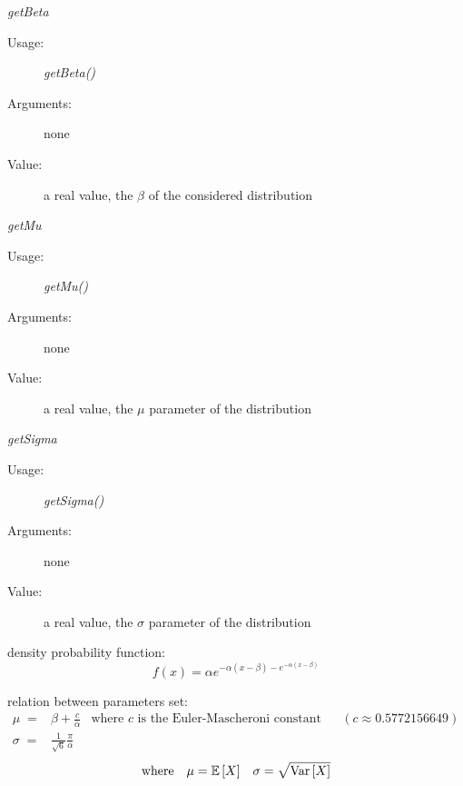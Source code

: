 \begin{description}
\begin{description}
\item \textit{getBeta}
\begin{description}
\item[Usage:] \textit{getBeta()}
\item[Arguments:] none
\item[Value:]  a real value, the  $\beta$ of the considered distribution
\end{description}
\bigskip
\item \textit{getMu}
\begin{description}
\item[Usage:] \textit{getMu()}
\item[Arguments:] none
\item[Value:]  a real value,  the $\mu$ parameter of the  distribution
\end{description}
\bigskip
\item \textit{getSigma}
\begin{description}
\item[Usage:] \textit{getSigma()}
\item[Arguments:] none
\item[Value:]  a real value,  the $\sigma$ parameter of the  distribution
\end{description}
\bigskip
\end{description}

\item[Details:]  \rule{0pt}{1em}
\begin{description}
\item density probability function:
\begin{equation}
f(x) = \alpha e^{-\alpha(x-\beta)-e^{-\alpha(x-\beta)}}
\end{equation}
\item relation between parameters set:
\begin{align*}
\mu \;            =       &   \beta + \frac{c}{\alpha}
& \mbox{where $c$ is the Euler-Mascheroni constant}
&& (c \approx 0.5772156649)
\\
\sigma \;  =      &       \frac{1}{\sqrt{6}}\frac{\pi}{\alpha}
\end{align*}
\begin{align*}
\mbox{where}
&&
\mu = {\mathbb E}\left[ X \right]
&&
\sigma = \sqrt{{\rm Var}\left[ X \right] }
\end{align*}
\end{description}

\item[Links:]  \rule{0pt}{1em}
\end{description}

